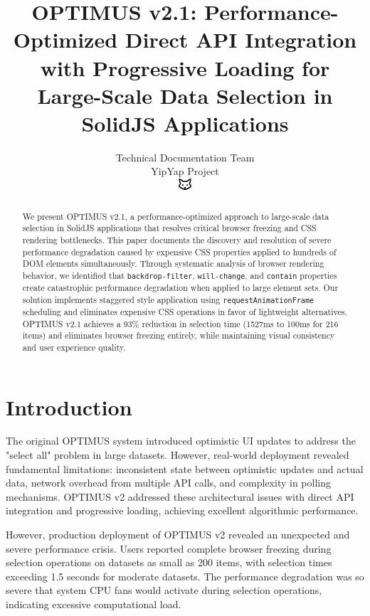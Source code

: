 \documentclass[10pt]{article}
\begin{document}
\title{OPTIMUS v2.1: Performance-Optimized Direct API Integration with Progressive Loading for Large-Scale Data Selection in SolidJS Applications}

\author{Technical Documentation Team\\
YipYap Project\\
\includegraphics[width=0.5cm]{favicon.pdf}}

\maketitle

\begin{abstract}
We present OPTIMUS v2.1, a performance-optimized approach to large-scale data selection in SolidJS applications that resolves critical browser freezing and CSS rendering bottlenecks. This paper documents the discovery and resolution of severe performance degradation caused by expensive CSS properties applied to hundreds of DOM elements simultaneously. Through systematic analysis of browser rendering behavior, we identified that \texttt{backdrop-filter}, \texttt{will-change}, and \texttt{contain} properties create catastrophic performance degradation when applied to large element sets. Our solution implements staggered style application using \texttt{requestAnimationFrame} scheduling and eliminates expensive CSS operations in favor of lightweight alternatives. OPTIMUS v2.1 achieves a 93\% reduction in selection time (1527ms to 100ms for 216 items) and eliminates browser freezing entirely, while maintaining visual consistency and user experience quality.
\end{abstract}

\section{Introduction}

The original OPTIMUS system introduced optimistic UI updates to address the "select all" problem in large datasets. However, real-world deployment revealed fundamental limitations: inconsistent state between optimistic updates and actual data, network overhead from multiple API calls, and complexity in polling mechanisms. OPTIMUS v2 addressed these architectural issues with direct API integration and progressive loading, achieving excellent algorithmic performance.

However, production deployment of OPTIMUS v2 revealed an unexpected and severe performance crisis. Users reported complete browser freezing during selection operations on datasets as small as 200 items, with selection times exceeding 1.5 seconds for moderate datasets. The performance degradation was so severe that system CPU fans would activate during selection operations, indicating excessive computational load.
\end{document}
